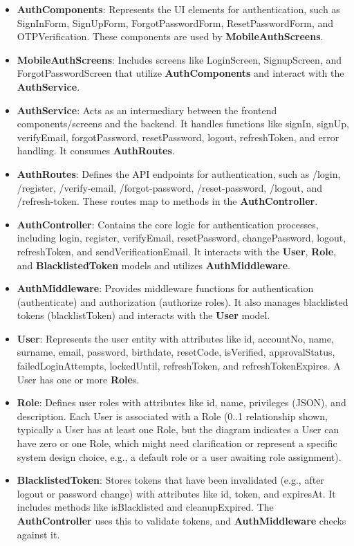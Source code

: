\begin{itemize}
    \item \textbf{AuthComponents}: Represents the UI elements for authentication, such as SignInForm, SignUpForm, ForgotPasswordForm, ResetPasswordForm, and OTPVerification. These components are used by \textbf{MobileAuthScreens}.
    \item \textbf{MobileAuthScreens}: Includes screens like LoginScreen, SignupScreen, and ForgotPasswordScreen that utilize \textbf{AuthComponents} and interact with the \textbf{AuthService}.
    \item \textbf{AuthService}: Acts as an intermediary between the frontend components/screens and the backend. It handles functions like signIn, signUp, verifyEmail, forgotPassword, resetPassword, logout, refreshToken, and error handling. It consumes \textbf{AuthRoutes}.
    \item \textbf{AuthRoutes}: Defines the API endpoints for authentication, such as /login, /register, /verify-email, /forgot-password, /reset-password, /logout, and /refresh-token. These routes map to methods in the \textbf{AuthController}.
    \item \textbf{AuthController}: Contains the core logic for authentication processes, including login, register, verifyEmail, resetPassword, changePassword, logout, refreshToken, and sendVerificationEmail. It interacts with the \textbf{User}, \textbf{Role}, and \textbf{BlacklistedToken} models and utilizes \textbf{AuthMiddleware}.
    \item \textbf{AuthMiddleware}: Provides middleware functions for authentication (authenticate) and authorization (authorize roles). It also manages blacklisted tokens (blacklistToken) and interacts with the \textbf{User} model.
    \item \textbf{User}: Represents the user entity with attributes like id, accountNo, name, surname, email, password, birthdate, resetCode, isVerified, approvalStatus, failedLoginAttempts, lockedUntil, refreshToken, and refreshTokenExpires. A User has one or more \textbf{Role}s.
    \item \textbf{Role}: Defines user roles with attributes like id, name, privileges (JSON), and description. Each User is associated with a Role (0..1 relationship shown, typically a User has at least one Role, but the diagram indicates a User can have zero or one Role, which might need clarification or represent a specific system design choice, e.g., a default role or a user awaiting role assignment).
    \item \textbf{BlacklistedToken}: Stores tokens that have been invalidated (e.g., after logout or password change) with attributes like id, token, and expiresAt. It includes methods like isBlacklisted and cleanupExpired. The \textbf{AuthController} uses this to validate tokens, and \textbf{AuthMiddleware} checks against it.
\end{itemize}

